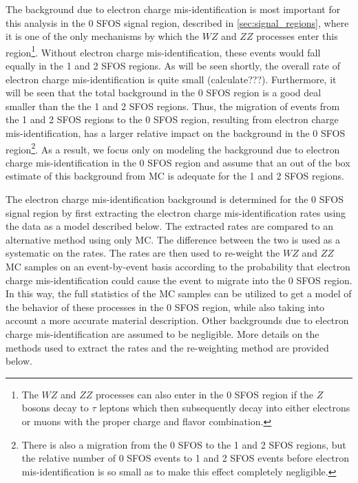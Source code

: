 The background due to electron charge mis-identification is most important 
for this analysis
in the 0 SFOS signal region, described in \sec\ref{sec:signal_regions},
where it is one of the only mechanisms by which the $WZ$ and $ZZ$ 
processes enter this region\footnote{The $WZ$ and $ZZ$ processes
can also enter in the 0 SFOS region if the $Z$ bosons
decay to $\tau$ leptons which then subsequently decay into 
either electrons or muons with the proper charge and flavor combination.}.
Without electron charge mis-identification, these events would fall
equally in the 1 and 2 SFOS regions.
As will be seen shortly, the overall rate of electron charge mis-identification
is quite small (calculate???). 
Furthermore, it will be seen that the total background in the 0 SFOS region is 
a good deal smaller than the the 1 and 2 SFOS regions. Thus, the
migration of events from the 1 and 2 SFOS regions to the 0 SFOS 
region, resulting from electron charge mis-identification, has
a larger relative impact on the background in the 0 SFOS 
region\footnote{There is also a migration from the 0 SFOS to the 1 and 2 SFOS 
regions, but the relative number of 0 SFOS events to 1 and 2 SFOS
events before electron mis-identification is so small as to make this
effect completely negligible.}.
As a result, we focus only on modeling the background due to electron
charge mis-identification in the 0 SFOS region and assume that an 
out of the box estimate of this background from MC is adequate for the 
1 and 2 SFOS regions.


The electron charge mis-identification background is determined
for the 0 SFOS signal region by first extracting the electron charge
mis-identification rates using the data as a model
described below. The extracted
rates are compared to an alternative method using only MC. 
The difference between the two is used as a systematic on the
rates. The rates are then used to re-weight the $WZ$ and $ZZ$ MC samples
on an event-by-event basis 
according to the probability that electron charge mis-identification
could cause the event to migrate into the 0 SFOS region. In this way, 
the full statistics of the MC samples can be utilized to get a model of
the behavior of these processes in the 0 SFOS region, while also taking 
into account a more accurate material description. Other backgrounds
due to electron charge mis-identification are assumed to be negligible.
More details on the methods used to extract the rates and the re-weighting
method are provided below.




